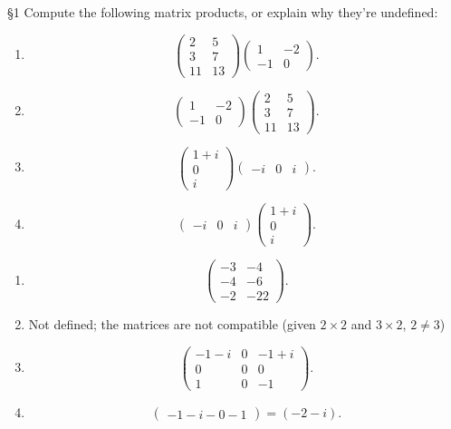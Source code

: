 \documentclass{review-sheet}
\begin{document}
\begin{problem}{\S 1}
  Compute the following matrix products, or explain why they're undefined:
  \begin{enumerate}[label=(\alph*)]
    \item \[
        \begin{pmatrix} 2&5\\3&7\\11&13 \end{pmatrix} \begin{pmatrix} 1&-2\\-1&0 \end{pmatrix} 
      .\] 
    \item \[
        \begin{pmatrix} 1&-2\\-1&0 \end{pmatrix} \begin{pmatrix} 2&5\\3&7\\11&13 \end{pmatrix}
      .\] 
    \item \[
        \begin{pmatrix} 1+i\\0\\i \end{pmatrix} \begin{pmatrix} -i&0&i \end{pmatrix} 
      .\] 
    \item \[
    \begin{pmatrix} -i&0&i \end{pmatrix} \begin{pmatrix} 1+i\\0\\i \end{pmatrix} 
    .\] 
  \end{enumerate}
\end{problem}

\begin{solution}
  \begin{enumerate}[label=(\alph*)]
    \item \[
        \begin{pmatrix} -3&-4\\-4&-6\\-2&-22 \end{pmatrix} 
      .\] 
    \item Not defined; the matrices are not compatible (given $2\times 2$ and $3\times 2$, $2\neq
      3$)
    \item \[
        \begin{pmatrix} -1-i&0&-1+i\\0&0&0\\1&0&-1 \end{pmatrix} 
      .\] 
    \item \[
        \begin{pmatrix} -1-i-0-1 \end{pmatrix} =(-2-i)
      .\] 
  \end{enumerate}
\end{solution}
\end{document}
